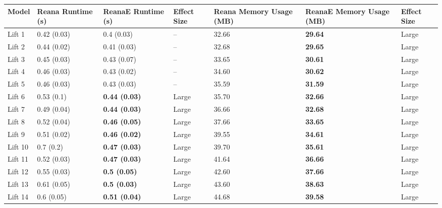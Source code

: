\begin{tabular}{lllllll}
\toprule
   Model & Reana Runtime (s) &    ReanaE Runtime (s) & Effect Size & Reana Memory Usage (MB) & ReanaE Memory Usage (MB) & Effect Size \\
\midrule
  Lift 1 &       0.42 (0.03) &            0.4 (0.03) &          -- &                   32.66 &           \textbf{29.64} &       Large \\
  Lift 2 &       0.44 (0.02) &           0.41 (0.03) &          -- &                   32.68 &           \textbf{29.65} &       Large \\
  Lift 3 &       0.45 (0.03) &           0.43 (0.07) &          -- &                   33.65 &           \textbf{30.61} &       Large \\
  Lift 4 &       0.46 (0.03) &           0.43 (0.02) &          -- &                   34.60 &           \textbf{30.62} &       Large \\
  Lift 5 &       0.46 (0.03) &           0.43 (0.03) &          -- &                   35.59 &           \textbf{31.59} &       Large \\
  Lift 6 &        0.53 (0.1) &  \textbf{0.44 (0.03)} &       Large &                   35.70 &           \textbf{32.66} &       Large \\
  Lift 7 &       0.49 (0.04) &  \textbf{0.44 (0.03)} &       Large &                   36.66 &           \textbf{32.68} &       Large \\
  Lift 8 &       0.52 (0.04) &  \textbf{0.46 (0.05)} &       Large &                   37.66 &           \textbf{33.65} &       Large \\
  Lift 9 &       0.51 (0.02) &  \textbf{0.46 (0.02)} &       Large &                   39.55 &           \textbf{34.61} &       Large \\
 Lift 10 &         0.7 (0.2) &  \textbf{0.47 (0.03)} &       Large &                   39.70 &           \textbf{35.61} &       Large \\
 Lift 11 &       0.52 (0.03) &  \textbf{0.47 (0.03)} &       Large &                   41.64 &           \textbf{36.66} &       Large \\
 Lift 12 &       0.55 (0.03) &   \textbf{0.5 (0.05)} &       Large &                   42.60 &           \textbf{37.66} &       Large \\
 Lift 13 &       0.61 (0.05) &   \textbf{0.5 (0.03)} &       Large &                   43.60 &           \textbf{38.63} &       Large \\
 Lift 14 &        0.6 (0.05) &  \textbf{0.51 (0.04)} &       Large &                   44.68 &           \textbf{39.58} &       Large \\

\end{tabular}
